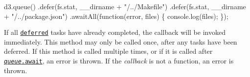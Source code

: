 \begin{DoxyCode}
d3.queue()
    .defer(fs.stat, \_\_dirname + "/../Makefile")
    .defer(fs.stat, \_\_dirname + "/../package.json")
    .awaitAll(function(error, files) \{ console.log(files); \});
\end{DoxyCode}


If all \href{#queue_defer}{\tt deferred} tasks have already completed, the callback will be invoked immediately. This method may only be called once, after any tasks have been deferred. If this method is called multiple times, or if it is called after \href{#queue_await}{\tt {\itshape queue}.await}, an error is thrown. If the {\itshape callback} is not a function, an error is thrown. 
